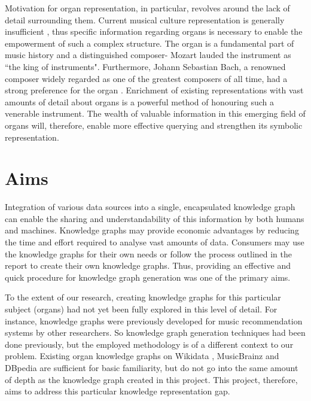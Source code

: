 Motivation for organ representation, in particular, revolves around the lack of detail surrounding them. Current musical culture representation is generally insufficient \cite{polifoniaproject}, thus specific information regarding organs is necessary to enable the empowerment of such a complex structure. The organ is a fundamental part of music history and a distinguished composer- Mozart lauded the instrument as ``the king of instruments". Furthermore, Johann Sebastian Bach, a renowned composer widely regarded as one of the greatest composers of all time, had a strong preference for the organ \cite{wolff2011organs}. Enrichment of existing representations with vast amounts of detail about organs is a powerful method of honouring such a venerable instrument. The wealth of valuable information in this emerging field of organs will, therefore, enable more effective querying and strengthen its symbolic representation. 

\section{Aims}
\hspace{0.5cm} Integration of various data sources into a single, encapsulated knowledge graph can enable the sharing and understandability of this information by both humans and machines. Knowledge graphs may provide economic advantages by reducing the time and effort required to analyse vast amounts of data. Consumers may use the knowledge graphs for their own needs or follow the process outlined in the report to create their own knowledge graphs. Thus, providing an effective and quick procedure for knowledge graph generation was one of the primary aims.  

To the extent of our research, creating knowledge graphs for this particular subject (organs) had not yet been fully explored in this level of detail. For instance, knowledge graphs were previously developed for music recommendation systems \cite{oramas2016sound} by other researchers. So knowledge graph generation techniques had been done previously, but the employed methodology is of a different context to our problem. Existing organ knowledge graphs on Wikidata \cite{organwikidata}, MusicBrainz \cite{organmusicbrainz} and DBpedia \cite{organdbpedia} are sufficient for basic familiarity, but do not go into the same amount of depth as the knowledge graph created in this project. This project, therefore, aims to address this particular knowledge representation gap. 

